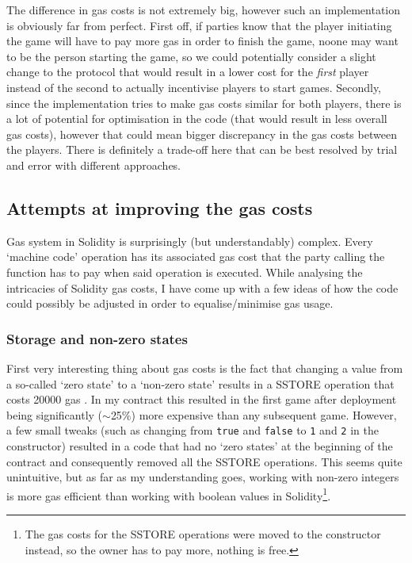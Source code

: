 \documentclass{article}
\begin{document}
    \noindent The difference in gas costs is not extremely
    big, however such an implementation is obviously far
    from perfect. First off, if parties know that the player
    initiating the game will have to pay more gas in order
    to finish the game, noone may want to be the person
    starting the game, so we could potentially consider a
    slight change to the protocol that would result in a
    lower cost for the {\itshape first} player instead of
    the second to actually incentivise players to start
    games. Secondly, since the implementation tries to make
    gas costs similar for both players, there is a lot of
    potential for optimisation in the code (that would
    result in less overall gas costs), however that could
    mean bigger discrepancy in the gas costs between the
    players. There is definitely a trade-off here that can
    be best resolved by trial and error with different
    approaches.
    
    \subsection{Attempts at improving the gas costs}
    Gas system in Solidity is surprisingly (but
    understandably) complex. Every `machine code' operation
    has its associated gas cost that the party calling the
    function has to pay when said operation is executed.
    While analysing the intricacies of Solidity gas costs, I
    have come up with a few ideas of how the code could
    possibly be adjusted in order to equalise/minimise gas
    usage.

    \subsubsection{Storage and non-zero states}
    First very interesting thing about gas costs is the fact
    that changing a value from a so-called `zero state' to a
    `non-zero state' results in a SSTORE operation that
    costs 20000 gas \cite{ypaper}. In my contract this
    resulted in the first game after deployment being
    significantly (\(\sim\)25\%) more expensive than any
    subsequent game. However, a few small tweaks (such as
    changing from \verb|true| and \verb|false| to \verb|1|
    and \verb|2| in the constructor) resulted in a code that
    had no `zero states' at the beginning of the contract
    and consequently removed all the SSTORE operations. This
    seems quite unintuitive, but as far as my understanding
    goes, working with non-zero integers is more gas
    efficient than working with boolean values in
    Solidity\footnote{The gas costs for the SSTORE
    operations were moved to the constructor instead, so the
    owner has to pay more, nothing is free.}.
    \newline
\end{document}
